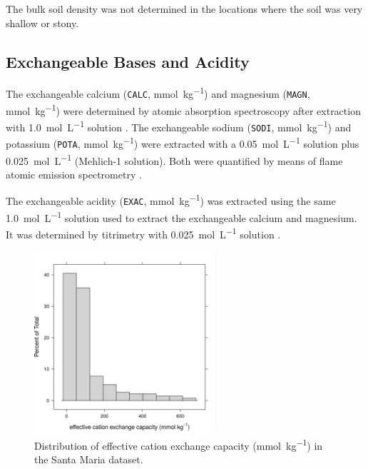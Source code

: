The bulk soil density was not determined in the locations where the soil was very shallow or stony.

\subsection{Exchangeable Bases and Acidity}
\label{chap:chap04-ecec}

\ifprint
\else
\fi

The exchangeable calcium (\texttt{CALC}, \si{\milli\mole\per\kilo\gram}) and magnesium (\texttt{MAGN}, 
\si{\milli\mole\per\kilo\gram}) were determined by atomic absorption spectroscopy after extraction with 
\SI{1.0}{\mole\per\liter}  solution \cite{ClaessenEtAl1997}. The exchangeable sodium (\texttt{SODI}, 
\si{\milli\mole\per\kilo\gram}) and potassium (\texttt{POTA}, \si{\milli\mole\per\kilo\gram}) were extracted 
with a \SI{0.05}{\mole\per\liter}  solution plus \SI{0.025}{\mole\per\liter}  
(Mehlich-\num{1} solution). Both were quantified by means of flame atomic emission spectrometry 
\cite{TedescoEtAl1995}.

The exchangeable acidity (\texttt{EXAC}, \si{\milli\mole\per\kilo\gram}) was extracted using the same 
\SI{1.0}{\mole\per\liter}  solution used to extract the exchangeable calcium and magnesium. It was 
determined by titrimetry with \SI{0.025}{\mole\per\liter}  solution \cite{ClaessenEtAl1997}.


\begin{figure}[!ht]
\centering
\includegraphics[width=0.60\textwidth]{fig/chap04-ecec}
\caption[Distribution of effective cation exchange capacity in the Santa Maria dataset.]{Distribution of 
effective cation exchange capacity (\si{\milli\mole\per\kilo\gram}) in the Santa Maria dataset.}
\label{fig:chap04-ecec}
\end{figure}

